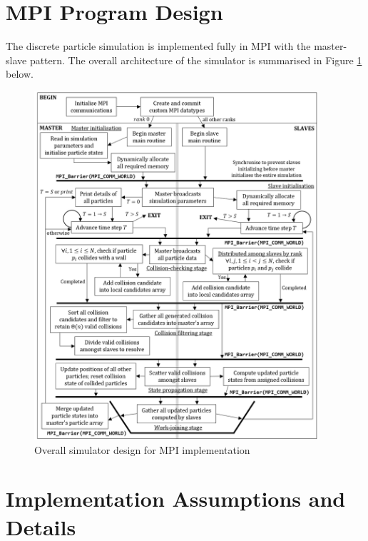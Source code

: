 \documentclass[12pt]{article}
\begin{document}
\maketitle
\setcounter{tocdepth}{1}
\tableofcontents

\pagebreak
\section{MPI Program Design}

The discrete particle simulation is implemented fully in MPI with the master-slave pattern. The overall architecture of the simulator is summarised in Figure \ref{fig:simulator-design} below.

\begin{figure}[H]
    \includegraphics[width=0.94\textwidth]{chap1Flowchart-MPI}
    \centering
    \caption{Overall simulator design for MPI implementation}
    \label{fig:simulator-design}
\end{figure}

\pagebreak

\section{Implementation Assumptions and Details}
\end{document}
